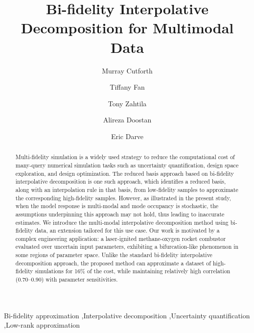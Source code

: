 \documentclass[preprint,10pt]{elsarticle}
\begin{document}
\begin{frontmatter}

\title{Bi-fidelity Interpolative Decomposition for Multimodal Data}

\author[1]{Murray Cutforth}
\author[2]{Tiffany Fan}
\author[3]{Tony Zahtila}
\author[4]{Alireza Doostan}
\author[1]{Eric Darve}




\begin{abstract}


Multi-fidelity simulation is a widely used strategy to reduce the computational cost of many-query numerical simulation tasks such as uncertainty quantification, design space exploration, and design optimization. The reduced basis approach based on bi-fidelity interpolative decomposition is one such approach, which identifies a reduced basis, along with an interpolation rule in that basis, from low-fidelity samples to approximate the corresponding high-fidelity samples. However, as illustrated in the present study, when the model response is multi-modal and mode occupancy is stochastic, the assumptions underpinning this approach may not hold, thus leading to inaccurate estimates. We introduce the multi-modal interpolative decomposition method using bi-fidelity data, an extension tailored for this use case. Our work is motivated by a complex engineering application: a laser-ignited methane-oxygen rocket combustor evaluated over uncertain input parameters, exhibiting a bifurcation-like phenomenon in some regions of parameter space. Unlike the standard bi-fidelity interpolative decomposition approach, the proposed method can approximate a dataset of high-fidelity simulations for 16\% of the cost, while maintaining relatively high correlation (0.70--0.90) with parameter sensitivities.

\end{abstract}


\begin{keyword}
Bi-fidelity approximation \sep Interpolative decomposition \sep Uncertainty quantification \sep Low-rank
approximation
\end{keyword}


\end{frontmatter}
\end{document}
